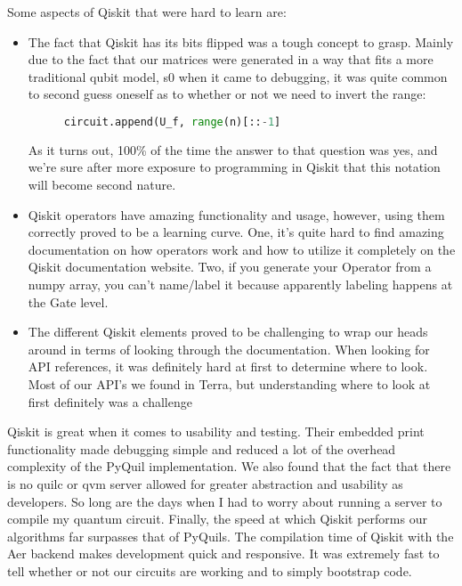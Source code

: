 \documentclass[12pt]{article}
\begin{document}
Some aspects of Qiskit that were hard to learn are:
\begin{itemize}
    \item The fact that Qiskit has its bits flipped was a tough concept to grasp. Mainly due to the fact that our matrices were generated in a way that fits a more traditional qubit model, s0 when it came to debugging, it was quite common to second guess oneself as to whether or not we need to invert the range:
\begin{figure}[h]
    \centering
    \begin{lstlisting}[numbers=none, language=Python]
    circuit.append(U_f, range(n)[::-1]
\end{lstlisting}
\end{figure}
As it turns out, 100\% of the time the answer to that question was yes, and we’re sure after more exposure to programming in Qiskit that this notation will become second nature.
    \item Qiskit operators have amazing functionality and usage, however, using them correctly proved to be a learning curve. One, it’s quite hard to find amazing documentation on how operators work and how to utilize it completely on the Qiskit documentation website. Two, if you generate your Operator from a numpy array, you can’t name/label it because apparently labeling happens at the Gate level. 
    \item The different Qiskit elements proved to be challenging to wrap our heads around in terms of looking through the documentation. When looking for API references, it was definitely hard at first to determine where to look. Most of our API’s we found in Terra, but understanding where to look at first definitely was a challenge
\end{itemize}

Qiskit is great when it comes to usability and testing. Their embedded print functionality made debugging simple and reduced a lot of the overhead complexity of the PyQuil implementation. We also found that the fact that there is no quilc or qvm server allowed for greater abstraction and usability as developers. So long are the days when I had to worry about running a server to compile my quantum circuit. Finally, the speed at which Qiskit performs our algorithms far surpasses that of PyQuils. The compilation time of Qiskit with the Aer backend makes development quick and responsive. It was extremely fast to tell whether or not our circuits are working and to simply bootstrap code.
\end{document}
